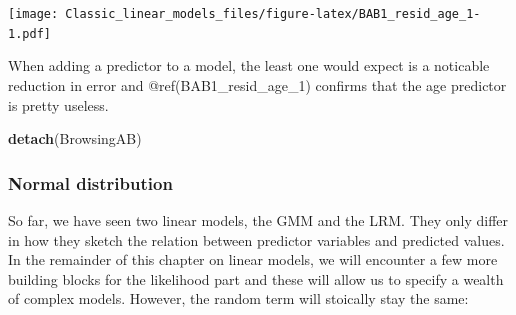 \documentclass[]{svmono}
\newenvironment{Shaded}{\begin{snugshade}}{\end{snugshade}}
\newcommand{\KeywordTok}[1]{\textcolor[rgb]{0.13,0.29,0.53}{\textbf{#1}}}
\newcommand{\DataTypeTok}[1]{\textcolor[rgb]{0.13,0.29,0.53}{#1}}
\newcommand{\DecValTok}[1]{\textcolor[rgb]{0.00,0.00,0.81}{#1}}
\newcommand{\StringTok}[1]{\textcolor[rgb]{0.31,0.60,0.02}{#1}}
\newcommand{\OperatorTok}[1]{\textcolor[rgb]{0.81,0.36,0.00}{\textbf{#1}}}
\newcommand{\NormalTok}[1]{#1}
\theoremstyle{definition}
\theoremstyle{definition}
\theoremstyle{definition}
\theoremstyle{remark}
\begin{document}
\begin{Shaded}
\end{Shaded}

\texttt{[image: Classic\_linear\_models\_files/figure-latex/BAB1\_resid\_age\_1-1.pdf]}

When adding a predictor to a model, the least one would expect is a
noticable reduction in error and @ref(BAB1\_resid\_age\_1) confirms that
the age predictor is pretty useless.

\begin{Shaded}
\begin{Highlighting}[]
\KeywordTok{detach}\NormalTok{(BrowsingAB)}
\end{Highlighting}
\end{Shaded}

\subsubsection{Normal distribution}\label{resid_normality}

So far, we have seen two linear models, the GMM and the LRM. They only
differ in how they sketch the relation between predictor variables and
predicted values. In the remainder of this chapter on linear models, we
will encounter a few more building blocks for the likelihood part and
these will allow us to specify a wealth of complex models. However, the
random term will stoically stay the same:
\end{document}
